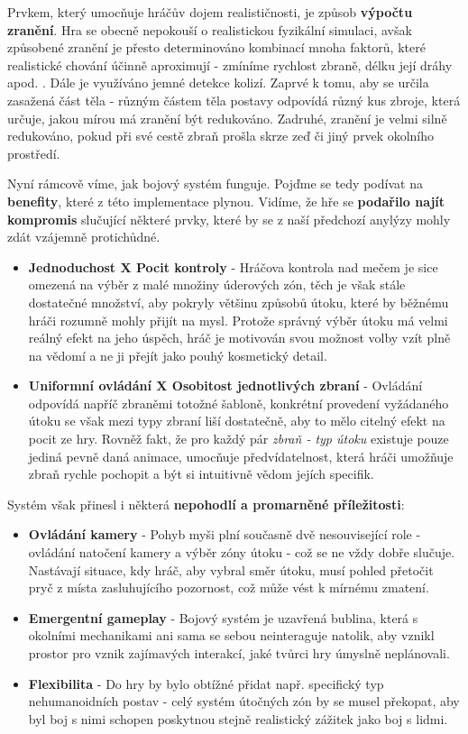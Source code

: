 Prvkem, který umocňuje hráčův dojem realističnosti, je způsob \textbf{výpočtu zranění}. Hra se obecně nepokouší o realistickou fyzikální simulaci, avšak způsobené zranění je přesto determinováno kombinací mnoha faktorů, které realistické chování účinně aproximují - zmíníme rychlost zbraně, délku její dráhy apod. . Dále je využíváno jemné detekce kolizí. Zaprvé k tomu, aby se určila zasažená část těla - různým částem těla postavy odpovídá různý kus zbroje, která určuje, jakou mírou má zranění být redukováno. Zadruhé, zranění je velmi silně redukováno, pokud při své cestě zbraň prošla skrze zeď či jiný prvek okolního prostředí. 

Nyní rámcově víme, jak bojový systém funguje. Pojďme se tedy podívat na \textbf{benefity}, které z této implementace plynou. Vidíme, že hře se \textbf{podařilo najít kompromis} slučující některé prvky, které by se z naší předchozí anylýzy mohly zdát vzájemně protichůdné.
\begin{itemize}
    \item \textbf{Jednoduchost X Pocit kontroly} - Hráčova kontrola nad mečem je sice omezená na výběr z malé množiny úderových zón, těch je však stále dostatečné množství, aby pokryly většinu způsobů útoku, které by běžnému hráči rozumně mohly přijít na mysl. Protože správný výběr útoku má velmi reálný efekt na jeho úspěch, hráč je motivován svou možnost volby vzít plně na vědomí a ne ji přejít jako pouhý kosmetický detail. 
    \item \textbf{Uniformní ovládání X Osobitost jednotlivých zbraní} - Ovládání odpovídá napříč zbraněmi totožné šabloně, konkrétní provedení vyžádaného útoku se však mezi typy zbraní liší dostatečně, aby to mělo citelný efekt na pocit ze hry. Rovněž fakt, že pro každý pár \textit{zbraň - typ útoku} existuje pouze jediná pevně daná animace, umocňuje předvídatelnost, která hráči umožňuje zbraň rychle pochopit a být si intuitivně vědom jejích specifik.
\end{itemize}

Systém však přinesl i některá \textbf{nepohodlí a promarněné příležitosti}:
\begin{itemize}
    \item \textbf{Ovládání kamery} - Pohyb myši plní současně dvě nesouvisející role - ovládání natočení kamery a výběr zóny útoku - což se ne vždy dobře slučuje. Nastávají situace, kdy hráč, aby vybral směr útoku, musí pohled přetočit pryč z místa zasluhujícího pozornost, což může vést k mírnému zmatení.  
    \item \textbf{Emergentní gameplay} - Bojový systém je uzavřená bublina, která s okolními mechanikami ani sama se sebou neinteraguje natolik, aby vznikl prostor pro vznik zajímavých interakcí, jaké tvůrci hry úmyslně neplánovali.
    \item \textbf{Flexibilita} - Do hry by bylo obtížné přidat např. specifický typ nehumanoidních postav - celý systém útočných zón by se musel překopat, aby byl boj s nimi schopen poskytnou stejně realistický zážitek jako boj s lidmi.
\end{itemize}

